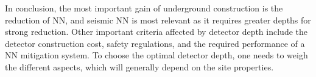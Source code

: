 In conclusion, the most important gain of underground construction is the reduction of NN, and seismic NN is most relevant as it requires greater depths for strong reduction. Other important criteria affected by detector depth include the detector construction cost, safety regulations, and the required performance of a NN mitigation system. To choose the optimal detector depth, one needs to weigh the different aspects, which will generally depend on the site properties.







